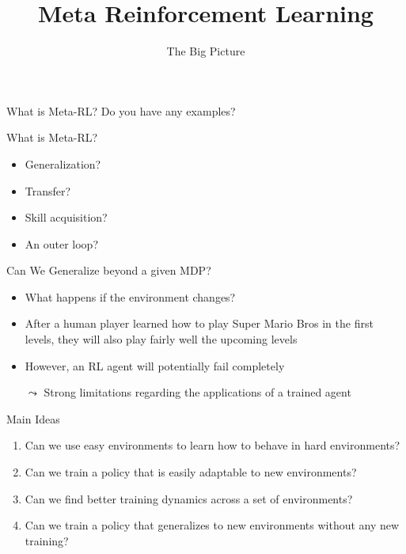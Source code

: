 \documentclass[aspectratio=169]{../latex_main/tntbeamer}  %
\title[Meta-RL]{Meta Reinforcement Learning}
\subtitle{The Big Picture}
\begin{document}
	
	\maketitle

\begin{frame}{What is Meta-RL?}
    Do you have any examples?
\end{frame}

\begin{frame}{What is Meta-RL?}
\begin{itemize}
    \item Generalization?
    \item Transfer?
    \item Skill acquisition?
    \item An outer loop?
\end{itemize}
\end{frame}

\begin{frame}[c]{Can We Generalize beyond a given MDP?}
	
	\begin{itemize}
		\item What happens if the environment changes?
		\smallskip
		\item After a human player learned how to play Super Mario Bros in the first levels, they will also play fairly well the upcoming levels
		\item However, an RL agent will potentially  fail completely
		\item[$\leadsto$] Strong limitations regarding the applications of a trained agent
	\end{itemize}
	
\end{frame}
\begin{frame}[c]{Main Ideas}
	
	\begin{enumerate}
		\item Can we use easy environments to learn how to behave in hard environments?
		\pause
		\item Can we train a policy that is easily adaptable to new environments?
		\pause
		\item Can we find better training dynamics across a set of environments?
		\pause
		\item Can we train a policy that generalizes to new environments without any new training?
	\end{enumerate}

\end{frame}
\end{document}
